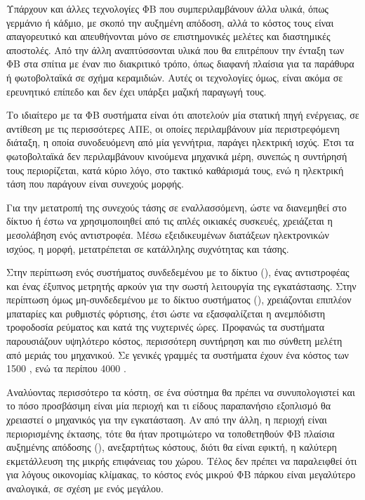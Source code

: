 \documentclass[12pt]{report}
\begin{document}
Υπάρχουν και άλλες τεχνολογίες ΦΒ που συμπεριλαμβάνουν άλλα υλικά, όπως γερμάνιο ή κάδμιο, με σκοπό την αυξημένη απόδοση, αλλά το κόστος τους είναι απαγορευτικό και απευθήνονται μόνο σε επιστημονικές μελέτες και διαστημικές
αποστολές. Από την άλλη αναπτύσσονται υλικά που θα επιτρέπουν την ένταξη των ΦΒ στα σπίτια με έναν πιο διακριτικό τρόπο, όπως διαφανή πλαίσια για τα παράθυρα ή φωτοβολταϊκά σε σχήμα κεραμιδιών. Αυτές οι τεχνολογίες όμως, είναι
ακόμα σε ερευνητικό επίπεδο και δεν έχει υπάρξει μαζική παραγωγή τους.

Το ιδιαίτερο με τα ΦΒ συστήματα είναι ότι αποτελούν μία στατική πηγή ενέργειας, σε αντίθεση με τις περισσότερες ΑΠΕ, οι οποίες περιλαμβάνουν μία περιστρεφόμενη διάταξη, η οποία συνοδευόμενη από μία γεννήτρια, παράγει ηλεκτρική
ισχύς. Έτσι τα φωτοβολταϊκά δεν περιλαμβάνουν κινούμενα μηχανικά μέρη, συνεπώς η συντήρησή τους περιορίζεται, κατά κύριο λόγο, στο τακτικό καθάρισμά τους, ενώ η ηλεκτρική τάση που παράγουν είναι συνεχούς μορφής.

Για την μετατροπή της συνεχούς τάσης σε εναλλασσόμενη, ώστε να διανεμηθεί στο δίκτυο ή έστω να χρησιμοποιηθεί από τις απλές οικιακές συσκευές, χρειάζεται η μεσολάβηση ενός αντιστροφέα. Μέσω εξειδικευμένων διατάξεων ηλεκτρονικών
ισχύος, η {} μορφή, μετατρέπεται σε {} κατάλληλης συχνότητας και τάσης. 

Στην περίπτωση ενός συστήματος συνδεδεμένου με το δίκτυο ({}), ένας αντιστροφέας και ένας έξυπνος μετρητής αρκούν για την σωστή λειτουργία της εγκατάστασης. Στην περίπτωση όμως μη-συνδεδεμένου με το δίκτυο
συστήματος ({}), χρειάζονται επιπλέον μπαταρίες και ρυθμιστές φόρτισης, έτσι ώστε να εξασφαλίζεται η ανεμπόδιστη τροφοδοσία ρεύματος και κατά της νυχτερινές ώρες. Προφανώς τα {}
συστήματα παρουσιάζουν υψηλότερο κόστος, περισσότερη συντήρηση και πιο σύνθετη μελέτη από μεριάς του μηχανικού. Σε γενικές γραμμές τα {} συστήματα έχουν ένα κόστος των 1500 {}, ενώ τα 
{} περίπου 4000 {}.

Αναλύοντας περισσότερο τα κόστη, σε ένα σύστημα θα πρέπει να συνυπολογιστεί και το πόσο προσβάσιμη είναι μία περιοχή και τι είδους παραπανήσιο εξοπλισμό θα χρειαστεί ο μηχανικός για την εγκατάσταση. 
Αν από την άλλη, η περιοχή είναι περιορισμένης έκτασης, τότε θα ήταν προτιμώτερο να τοποθετηθούν ΦΒ πλαίσια αυξημένης απόδοσης ({}), ανεξαρτήτως κόστους, διότι θα είναι εφικτή, η καλύτερη εκμετάλλευση 
της μικρής επιφάνειας του χώρου. Τέλος δεν
πρέπει να παραλειφθεί ότι για λόγους οικονομίας κλίμακας, το κόστος ενός μικρού ΦΒ πάρκου είναι μεγαλύτερο αναλογικά, σε σχέση με ενός μεγάλου. 
\end{document}
